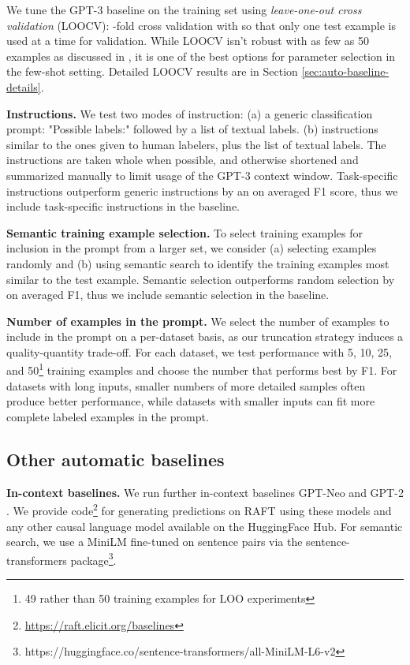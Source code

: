 \documentclass{article}
\newcommand{\name}{\textsc{RAFT}}
\newcommand{\baselinesURL}{\href{https://raft.elicit.org/baselines}{https://raft.elicit.org/baselines}}
\begin{document}
We tune the GPT-3 baseline on the training set using \textit{leave-one-out cross validation} (LOOCV): -fold cross validation with  so that only one test example is used at a time for validation. While LOOCV isn't robust with as few as 50 examples as discussed in \citet{perez2021true}, it is one of the best options for parameter selection in the few-shot setting. Detailed LOOCV results are in Section \ref{sec:auto-baseline-details}.

\textbf{Instructions.} We test two modes of instruction: (a) a generic classification prompt: "Possible labels:" followed by a list of textual labels. (b) instructions similar to the ones given to human labelers, plus the list of textual labels. The instructions are taken whole when possible, and otherwise shortened and summarized manually to limit usage of the GPT-3 context window. Task-specific instructions outperform generic instructions by an  on averaged F1 score, thus we include task-specific instructions in the baseline.

\textbf{Semantic training example selection.} To select training examples for inclusion in the prompt from a larger set, we consider (a) selecting examples randomly and (b) using semantic search to identify the training examples most similar to the test example. Semantic selection outperforms random selection by  on averaged F1, thus we include semantic selection in the baseline.

\textbf{Number of examples in the prompt.} We select the number of examples to include in the prompt on a per-dataset basis, as our truncation strategy induces a quality-quantity trade-off. For each dataset, we test performance with 5, 10, 25, and 50\footnote{49 rather than 50 training examples for LOO experiments} training examples and choose the number that performs best by F1. For datasets with long inputs, smaller numbers of more detailed samples often produce better performance, while datasets with smaller inputs can fit more complete labeled examples in the prompt.

\subsection{Other automatic baselines}

\textbf{In-context baselines.} We run further in-context baselines GPT-Neo \citep{gpt-neo} and GPT-2 \citep{radford2019language}. We provide code\footnote{\baselinesURL{}} for generating predictions on \name{} using these models and any other causal language model available on the HuggingFace Hub. For semantic search, we use a MiniLM \citep{wang2020minilm} fine-tuned on sentence pairs via the sentence-transformers package\footnote{https://huggingface.co/sentence-transformers/all-MiniLM-L6-v2}.
\end{document}
